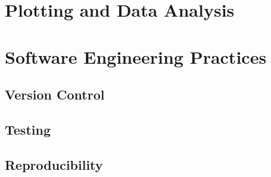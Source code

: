 \documentclass[11pt]{book}
\begin{document}
\part{Plotting and Data Analysis}




\part{Software Engineering Practices}

\chapter{Version Control}

\chapter{Testing}

\chapter{Reproducibility}


\backmatter

%
%
\end{document}
